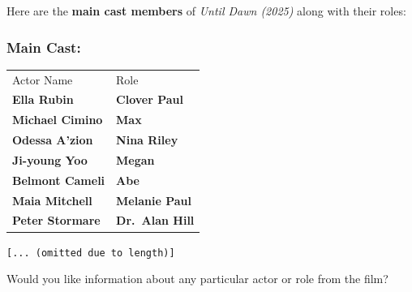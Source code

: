 \documentclass[fleqn,moreauthors,10pt]{ds_report}
\begin{document}
\begin{appendix}
\begin{tcolorbox}[enhanced,breakable,float*,width=\textwidth,title=Conversation Example with Advanced Qwen,floatplacement=!t]
\begin{adjustwidth}{20pt}{0pt}

Here are the \textbf{main cast members} of \emph{Until Dawn (2025)}
along with their roles:

\subsubsection*{Main Cast:}

\begin{tabular}{ l l }
    Actor Name & Role \\
    \textbf{Ella Rubin} & \textbf{Clover Paul} \\
    \textbf{Michael Cimino} & \textbf{Max} \\
    \textbf{Odessa A'zion} & \textbf{Nina Riley} \\
    \textbf{Ji-young Yoo} & \textbf{Megan} \\
    \textbf{Belmont Cameli} & \textbf{Abe} \\
    \textbf{Maia Mitchell} & \textbf{Melanie Paul} \\
    \textbf{Peter Stormare} & \textbf{Dr.~Alan Hill} \\
\end{tabular}

\texttt{[... (omitted due to length)]} 

Would you like information about any particular actor or role from the
film?

\end{adjustwidth}
\end{tcolorbox}

\vfill

\end{appendix}
\end{document}
